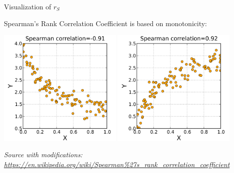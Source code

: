 \documentclass{beamer}
\begin{document}
\begin{frame}
{\centerline{Visualization of $r_S$}}

Spearman's Rank Correlation Coefficient is based on monotonicity:

\begin{center}
\includegraphics[width=0.45\textwidth]{A2022.IDSEPC.Correlazione/600px-Spearman_fig4.png}
\includegraphics[width=0.45\textwidth]{A2022.IDSEPC.Correlazione/600px-Spearman_fig5.png}
\end{center} 

\textit{\tiny
\vspace{-\baselineskip}
Source with modifications: \url{https://en.wikipedia.org/wiki/Spearman\%27s_rank_correlation_coefficient}}

\end{frame}
\end{document}

